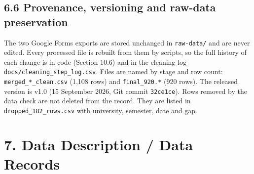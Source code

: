 \documentclass[11pt,a4paper]{article}
\begin{document}
\subsection{6.6 Provenance, versioning and raw-data preservation}
The two Google Forms exports are stored unchanged in \texttt{raw-data/} and are never edited. Every processed file is rebuilt from them by scripts, so the full history of each change is in code (Section 10.6) and in the cleaning log \texttt{docs/cleaning\_step\_log.csv}. Files are named by stage and row count: \texttt{merged\_*\_clean.csv} (1,108 rows) and \texttt{final\_920.*} (920 rows). The released version is v1.0 (15 September 2026, Git commit \texttt{32ce1ce}). Rows removed by the data check are not deleted from the record. They are listed in \texttt{dropped\_182\_rows.csv} with university, semester, date and gap.

\section{7. Data Description / Data Records}
\end{document}
